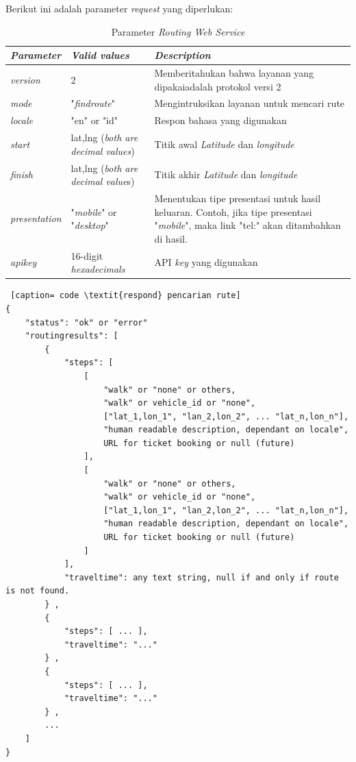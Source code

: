 Berikut ini adalah parameter \textit{request} yang diperlukan:

\begin{table}[h]
\begin{tabular}{ |p{3cm}|p{3cm}|p{8cm}| }
	\hline
	\textit{Parameter} & \textit{Valid values} & \textit{Description} \\ \hline \hline
  \textit{version} & 2 & Memberitahukan bahwa layanan yang dipakaiadalah protokol versi 2 \\ \hline
  \textit{mode} & "\textit{findroute}" & Mengintruksikan layanan untuk mencari rute \\ \hline
  \textit{locale} & "en" or "id" & Respon bahasa yang digunakan \\ \hline
	\textit{start} & lat,lng (\textit{both are decimal values}) & Titik awal \textit{Latitude} dan \textit{longitude} \\ \hline
  \textit{finish} & lat,lng (\textit{both are decimal value}s) & Titik akhir \textit{Latitude} dan \textit{longitude}  \\ \hline
  \textit{presentation} & "\textit{mobile}" or "\textit{desktop}" & Menentukan tipe presentasi untuk hasil keluaran. Contoh, jika tipe presentasi "\textit{mobile}",  maka link "tel:" akan ditambahkan di hasil. \\ \hline
	\textit{apikey} & 16-digit \textit{hexadecimals} & API \textit{key} yang digunakan \\ \hline
\end{tabular}
	\caption{Parameter \textit{Routing Web Service}}
	\label{tab:TabelParameterRoutingWebService}
	\end{table}
	
\begin{lstlisting} [caption= code \textit{respond} pencarian rute]
{ 
    "status": "ok" or "error" 
    "routingresults": [ 
        {
            "steps": [
                [
                    "walk" or "none" or others,
                    "walk" or vehicle_id or "none",
                    ["lat_1,lon_1", "lan_2,lon_2", ... "lat_n,lon_n"],
                    "human readable description, dependant on locale",
                    URL for ticket booking or null (future)
                ],
                [
                    "walk" or "none" or others,
                    "walk" or vehicle_id or "none",
                    ["lat_1,lon_1", "lan_2,lon_2", ... "lat_n,lon_n"],
                    "human readable description, dependant on locale",
                    URL for ticket booking or null (future)
                ]
            ],
            "traveltime": any text string, null if and only if route is not found.
        } ,
        {
            "steps": [ ... ],
            "traveltime": "..."
        } ,
        {
            "steps": [ ... ],
            "traveltime": "..."
        } ,
        ...     
    ]
}
\end{lstlisting}

